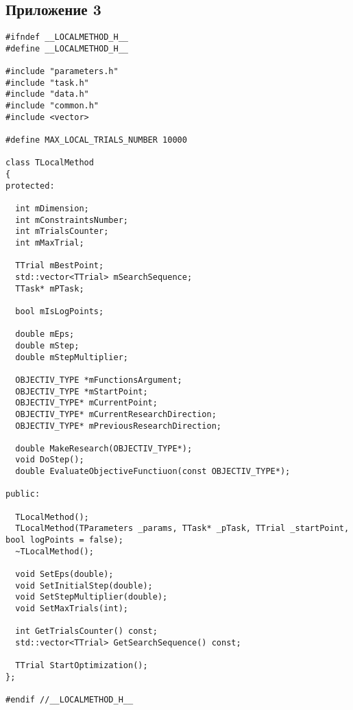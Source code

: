 \subsection{Приложение 3}
\label{attach3}
\begin{lstlisting}[frame=single]
#ifndef __LOCALMETHOD_H__
#define __LOCALMETHOD_H__

#include "parameters.h"
#include "task.h"
#include "data.h"
#include "common.h"
#include <vector>

#define MAX_LOCAL_TRIALS_NUMBER 10000

class TLocalMethod
{
protected:

  int mDimension;
  int mConstraintsNumber;
  int mTrialsCounter;
  int mMaxTrial;

  TTrial mBestPoint;
  std::vector<TTrial> mSearchSequence;
  TTask* mPTask;

  bool mIsLogPoints;

  double mEps;
  double mStep;
  double mStepMultiplier;

  OBJECTIV_TYPE *mFunctionsArgument;
  OBJECTIV_TYPE *mStartPoint;
  OBJECTIV_TYPE* mCurrentPoint;
  OBJECTIV_TYPE* mCurrentResearchDirection;
  OBJECTIV_TYPE* mPreviousResearchDirection;

  double MakeResearch(OBJECTIV_TYPE*);
  void DoStep();
  double EvaluateObjectiveFunctiuon(const OBJECTIV_TYPE*);

public:

  TLocalMethod();
  TLocalMethod(TParameters _params, TTask* _pTask, TTrial _startPoint, bool logPoints = false);
  ~TLocalMethod();

  void SetEps(double);
  void SetInitialStep(double);
  void SetStepMultiplier(double);
  void SetMaxTrials(int);

  int GetTrialsCounter() const;
  std::vector<TTrial> GetSearchSequence() const;

  TTrial StartOptimization();
};

#endif //__LOCALMETHOD_H__
\end{lstlisting}


